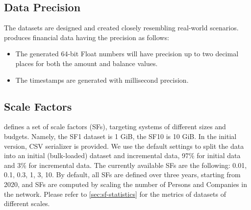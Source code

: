 \subsection{Data Precision}

The datasets are designed and created closely resembling real-world scenarios. {\DataGen} produces
financial data having the precision as follows:
\begin{itemize}
    \item The generated 64-bit Float numbers will have precision up to two decimal places for both
          the amount and balance values.
    \item The timestamps are generated with millisecond precision.
\end{itemize}

\subsection{Scale Factors}
\label{sec:scale-factors}

\ldbcfinbench defines a set of scale factors (SFs), targeting systems of different sizes and budgets. Namely, the SF1
dataset is 1 GiB, the SF10 is 10 GiB. In the initial version, CSV serializer is provided. We use the default settings
to split the data into an initial (bulk-loaded) dataset and incremental data, 97\% for initial data and 3\% for
incremental data. The currently available SFs are the following: 0.01, 0.1, 0.3, 1, 3, 10. By default, all SFs are
defined over three years,  starting from 2020, and SFs are computed by scaling the number of Persons and Companies in
the network. Please refer to \autoref{sec:sf-statistics} for the metrics of datasets of different scales.